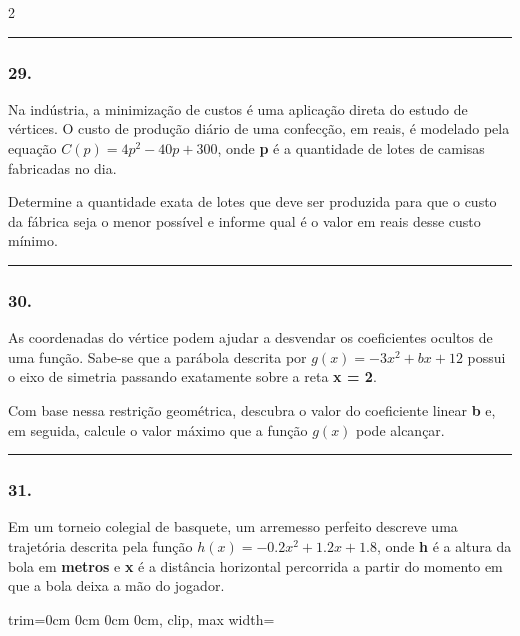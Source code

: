 \documentclass[twoside, 10pt, a4paper]{article}
\newlength{\espacoPreQuestao}
\newlength{\espacoQuestao}
\newlength{\larguraTikz}
\begin{document}
\begin{multicols*}{2}
\noindent\textcolor{CorLinha}{\rule{\linewidth}{0.5pt}} 
\par\vspace{\espacoPreQuestao}
\subsubsection*{29.} Na indústria, a minimização de custos é uma aplicação direta do estudo de vértices. O custo de produção diário de uma confecção, em reais, é modelado pela equação $C(p) = 4p^2 - 40p + 300$, onde \textbf{p} é a quantidade de lotes de camisas fabricadas no dia.

Determine a quantidade exata de lotes que deve ser produzida para que o custo da fábrica seja o menor possível e informe qual é o valor em reais desse custo mínimo.
\par\vspace{\espacoQuestao}

\noindent\textcolor{CorLinha}{\rule{\linewidth}{0.5pt}} 
\par\vspace{\espacoPreQuestao}
\subsubsection*{30.} As coordenadas do vértice podem ajudar a desvendar os coeficientes ocultos de uma função. Sabe-se que a parábola descrita por $g(x) = -3x^2 + bx + 12$ possui o eixo de simetria passando exatamente sobre a reta \textbf{x = 2}.

Com base nessa restrição geométrica, descubra o valor do coeficiente linear \textbf{b} e, em seguida, calcule o valor máximo que a função $g(x)$ pode alcançar.
\par\vspace{\espacoQuestao}
\noindent\textcolor{CorLinha}{\rule{\linewidth}{0.5pt}} 
\par\vspace{\espacoPreQuestao}
\subsubsection*{31.} Em um torneio colegial de basquete, um arremesso perfeito descreve uma trajetória descrita pela função $h(x) = -0.2x^2 + 1.2x + 1.8$, onde \textbf{h} é a altura da bola em \textbf{metros} e \textbf{x} é a distância horizontal percorrida a partir do momento em que a bola deixa a mão do jogador.

\begin{center}
\begin{adjustbox}{trim=0cm 0cm 0cm 0cm, clip, max width=\larguraTikz}
\end{adjustbox}
\end{center}
\end{multicols*}
\end{document}
